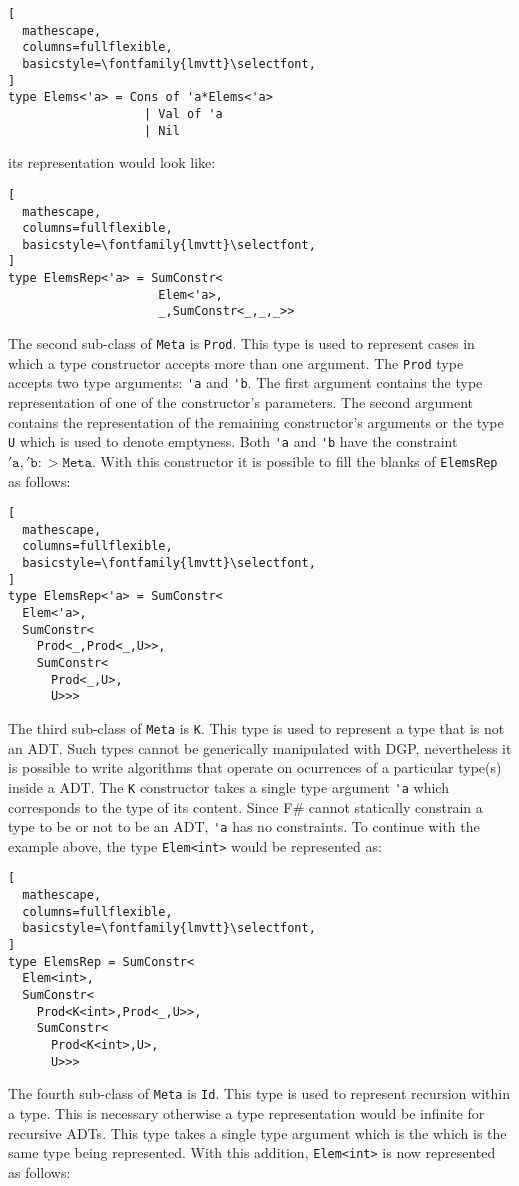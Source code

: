 \documentclass{sigplanconf}
\begin{document}
\begin{lstlisting}[
  mathescape,
  columns=fullflexible,
  basicstyle=\fontfamily{lmvtt}\selectfont,
]
type Elems<'a> = Cons of 'a*Elems<'a> 
                   | Val of 'a 
                   | Nil 
\end{lstlisting}
its representation would look like:
\begin{lstlisting}[
  mathescape,
  columns=fullflexible,
  basicstyle=\fontfamily{lmvtt}\selectfont,
]
type ElemsRep<'a> = SumConstr<
                     Elem<'a>,
                     _,SumConstr<_,_,_>>
\end{lstlisting}
The second sub-class of \verb+Meta+ is \verb+Prod+. This type is used to represent cases in which a type constructor accepts more than one argument. The \verb+Prod+ type accepts two type arguments: \verb+'a+ and \verb+'b+. The first argument contains the type representation of one of the constructor's parameters. The second argument contains the representation of the remaining constructor's arguments or the type \verb+U+ which is used to denote emptyness. Both \verb+'a+ and \verb+'b+ have the constraint $\mathtt{'a},\mathtt{'b} :> \mathtt{Meta}$. With this constructor it is possible to fill the blanks of \verb+ElemsRep+ as follows:
\begin{lstlisting}[
  mathescape,
  columns=fullflexible,
  basicstyle=\fontfamily{lmvtt}\selectfont,
]
type ElemsRep<'a> = SumConstr<
  Elem<'a>,
  SumConstr<
    Prod<_,Prod<_,U>>,
    SumConstr<
      Prod<_,U>,
      U>>>
\end{lstlisting}
The third sub-class of \verb+Meta+ is \verb+K+. This type is used to represent a type that is not an ADT. Such types cannot be generically manipulated with DGP, nevertheless it is possible to write algorithms that operate on ocurrences of a particular type(s) inside a ADT. The \verb+K+ constructor takes a single type argument \verb+'a+ which corresponds to the type of its content. Since F\# cannot statically constrain a type to be or not to be an ADT, \verb+'a+ has no constraints. To continue with the example above, the type \verb+Elem<int>+ would be represented as:
\begin{lstlisting}[
  mathescape,
  columns=fullflexible,
  basicstyle=\fontfamily{lmvtt}\selectfont,
]
type ElemsRep = SumConstr<
  Elem<int>,
  SumConstr<
    Prod<K<int>,Prod<_,U>>,
    SumConstr<
      Prod<K<int>,U>,
      U>>>
\end{lstlisting}
The fourth sub-class of \verb+Meta+ is \verb+Id+. This type is used to represent recursion within a type. This is necessary otherwise a type representation would be infinite for recursive ADTs. This type takes a single type argument which is the which is the same type being represented. With this addition, \verb+Elem<int>+ is now represented as follows:
\end{document}
